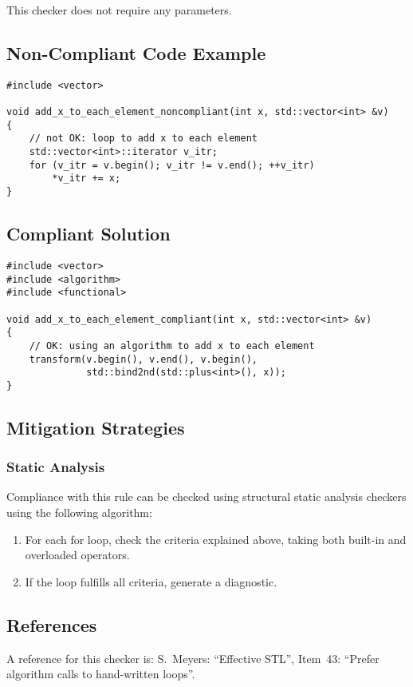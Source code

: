 This checker does not require any parameters.

\subsection{Non-Compliant Code Example}

\begin{verbatim}
#include <vector>

void add_x_to_each_element_noncompliant(int x, std::vector<int> &v)
{
    // not OK: loop to add x to each element
    std::vector<int>::iterator v_itr;
    for (v_itr = v.begin(); v_itr != v.end(); ++v_itr)
        *v_itr += x;
}
\end{verbatim}

\subsection{Compliant Solution}

\begin{verbatim}
#include <vector>
#include <algorithm>
#include <functional>

void add_x_to_each_element_compliant(int x, std::vector<int> &v)
{
    // OK: using an algorithm to add x to each element
    transform(v.begin(), v.end(), v.begin(),
              std::bind2nd(std::plus<int>(), x));
}
\end{verbatim}

\subsection{Mitigation Strategies}
\subsubsection{Static Analysis} 

Compliance with this rule can be checked using structural static analysis checkers using the following algorithm:

\begin{enumerate}
\item For each for loop, check the criteria explained above, taking both
built-in and overloaded operators.
\item If the loop fulfills all criteria, generate a diagnostic.
\end{enumerate}

\subsection{References}

A reference for this checker is: S.~Meyers: ``Effective STL'', Item~43:
``Prefer algorithm calls to hand-written loops''.
